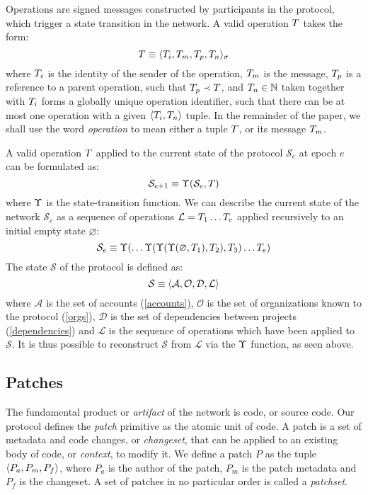 Operations are signed messages constructed by participants in the protocol,
which trigger a state transition in the network. A valid operation $T$ takes
the form:
\[
    T \equiv \langle T_i, T_m, T_p, T_n \rangle_{\sigma}
\]
where $T_i$ is the identity of the sender of the operation, $T_m$ is the
message, $T_p$ is a reference to a parent operation, such that $T_p
\prec T$, and $T_n \in \mathbb{N}$ taken together with $T_i$ forms a globally
unique operation identifier, such that there can be at most one operation with
a given $\langle T_i, T_n \rangle$ tuple. In the remainder of the paper, we shall
use the word \emph{operation} to mean either a tuple $T$, or its message $T_m$.

A valid operation $T$ applied to the current state of
the protocol $\mathcal{S}_e$ at epoch $e$ can be formulated as:
\[
    \mathcal{S}_{e+1} \equiv \Upsilon(\mathcal{S}_e, T)
\]
where $\Upsilon$ is the state-transition function.  We can describe the current
state of the network $\mathcal{S}_e$ as a sequence of operations $\mathcal{L} =
T_1 \dotso T_e$ applied recursively to an initial empty state
$\varnothing$:
\[
    \mathcal{S}_e \equiv \Upsilon(\dotso \Upsilon(\Upsilon(\Upsilon(\varnothing,
    T_1), T_2), T_3) \dotso T_e)
\]
The state $\mathcal{S}$ of the protocol is defined as:
\[
    \mathcal{S} \equiv \langle \mathcal{A}, \mathcal{O}, \mathcal{D}, \mathcal{L} \rangle \\
\]
where $\mathcal{A}$ is the set of accounts (\ref{accounts}), $\mathcal{O}$ is
the set of organizations known to the protocol (\ref{orgs}), $\mathcal{D}$ is
the set of dependencies between projects (\ref{dependencies}) and $\mathcal{L}$
is the sequence of operations which have been applied to $\mathcal{S}$. It is
thus possible to reconstruct $\mathcal{S}$ from $\mathcal{L}$ via the $\Upsilon$
function, as seen above.

\subsection{Patches}
\label{patches}

The fundamental product or \emph{artifact} of the \oscoin{} network is code, or
source code. Our protocol defines the \emph{patch} primitive as the atomic unit
of code. A patch is a set of metadata and code changes, or \emph{changeset},
that can be applied to an existing body of code, or \emph{context}, to modify
it. We define a patch $P$ as the tuple $\langle P_a, P_m, P_f \rangle$, where $P_a$ is
the author of the patch, $P_m$ is the patch metadata and $P_f$ is the
changeset. A set of patches in no particular order is called a \emph{patchset}.

